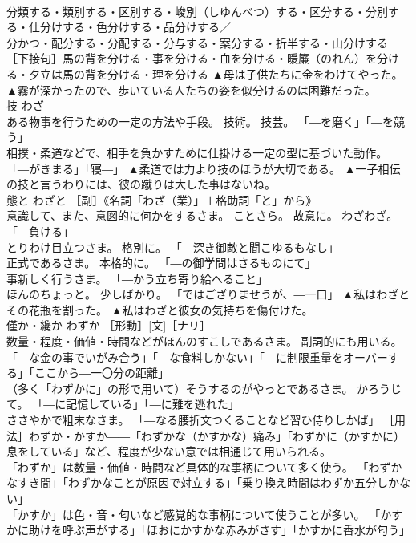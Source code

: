 \documentclass[8pt]{extreport}
\begin{document}
\begin{CJK}{UTF8}{min}
\\	分類する・類別する・区別する・峻別（しゆんべつ）する・区分する・分別する・仕分けする・色分けする・品分けする／
\\	分かつ・配分する・分配する・分与する・案分する・折半する・山分けする ［下接句］馬の背を分ける・事を分ける・血を分ける・暖簾（のれん）を分ける・夕立は馬の背を分ける・理を分ける	▲母は子供たちに金をわけてやった。 ▲霧が深かったので、歩いている人たちの姿を似分けるのは困難だった。
\\	技	わざ	
\\	ある物事を行うための一定の方法や手段。 技術。 技芸。 「―を磨く」「―を競う」 
\\	相撲・柔道などで、相手を負かすために仕掛ける一定の型に基づいた動作。 「―がきまる」「寝―」	▲柔道では力より技のほうが大切である。 ▲一子相伝の技と言うわりには、彼の蹴りは大した事はないね。
\\	態と	わざと	［副］《名詞「わざ（業）」＋格助詞「と」から》 
\\	意識して、また、意図的に何かをするさま。 ことさら。 故意に。 わざわざ。 「―負ける」 
\\	とりわけ目立つさま。 格別に。 「―深き御敵と聞こゆるもなし」 
\\	正式であるさま。 本格的に。 「―の御学問はさるものにて」 
\\	事新しく行うさま。 「―かう立ち寄り給へること」 
\\	ほんのちょっと。 少しばかり。 「ではござりませうが、―一口」	▲私はわざとその花瓶を割った。 ▲私はわざと彼女の気持ちを傷付けた。
\\	僅か・纔か	わずか	［形動］[文]［ナリ］ 
\\	数量・程度・価値・時間などがほんのすこしであるさま。 副詞的にも用いる。 「―な金の事でいがみ合う」「―な食料しかない」「―に制限重量をオーバーする」「ここから―一〇分の距離」 
\\	（多く「わずかに」の形で用いて）そうするのがやっとであるさま。 かろうじて。 「―に記憶している」「―に難を逃れた」 
\\	ささやかで粗末なさま。 「―なる腰折文つくることなど習ひ侍りしかば」 ［用法］わずか・かすか――「わずかな（かすかな）痛み」「わずかに（かすかに）息をしている」など、程度が少ない意では相通じて用いられる。 
\\	「わずか」は数量・価値・時間など具体的な事柄について多く使う。 「わずかなすき間」「わずかなことが原因で対立する」「乗り換え時間はわずか五分しかない」
\\	「かすか」は色・音・匂いなど感覚的な事柄について使うことが多い。 「かすかに助けを呼ぶ声がする」「ほおにかすかな赤みがさす」「かすかに香水が匂う」

\end{CJK}
\end{document}

